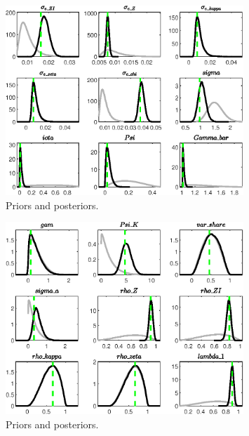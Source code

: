  
\begin{figure}[H]
\centering
\includegraphics[width=0.80\textwidth]{directed_search_est_alt_obs/Output/directed_search_est_alt_obs_PriorsAndPosteriors1}
\caption{Priors and posteriors.}\label{Fig:PriorsAndPosteriors:1}
\end{figure}
 
\begin{figure}[H]
\centering
\includegraphics[width=0.80\textwidth]{directed_search_est_alt_obs/Output/directed_search_est_alt_obs_PriorsAndPosteriors2}
\caption{Priors and posteriors.}\label{Fig:PriorsAndPosteriors:2}
\end{figure}
 
